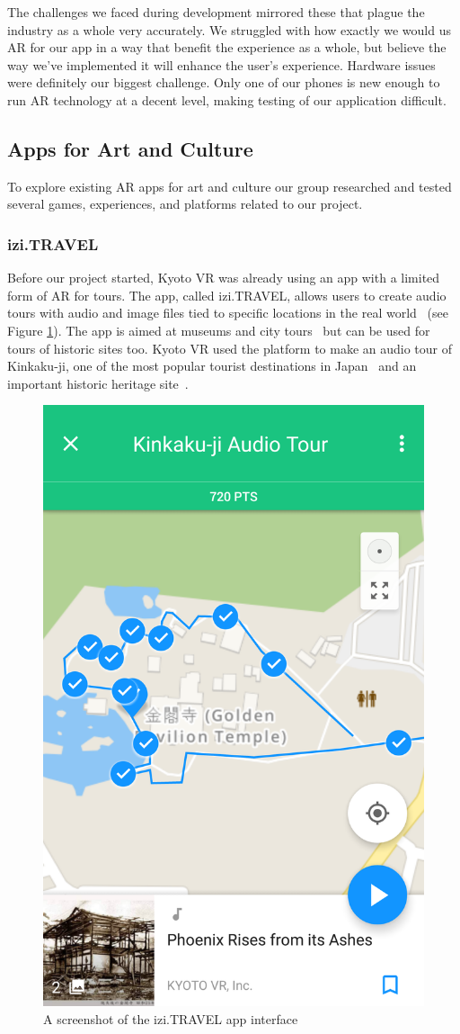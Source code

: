 \documentclass[a4paper, 10pt, american, titlepage]{article}
\begin{document}
The challenges we faced during development mirrored these that plague the
industry as a whole very accurately. We struggled with how exactly we would us
AR for our app in a way that benefit the experience as a whole, but believe the
way we've implemented it will enhance the user's experience. Hardware issues
were definitely our biggest challenge.  Only one of our phones is new enough to
run AR technology at a decent level, making testing of our application
difficult.  

\subsection{Apps for Art and Culture}
\label{sec:appsForArtAndCulture}

To explore existing AR apps for art and culture our group researched and tested
several games, experiences, and platforms related to our project.

\subsubsection{izi.TRAVEL}
\label{sec:iziTravel}

Before our project started, Kyoto VR was already using an app with a limited
form of AR for tours. The app, called izi.TRAVEL, allows users to create audio
tours with audio and image files tied to specific locations in the real
world~\autocite{izitravel2015} (see Figure \ref{fig:iziTravel}). The app is
aimed at museums and city tours~\autocite{izitravel} but can be used for tours
of historic sites too.  Kyoto VR used the platform to make an audio tour of
Kinkaku-ji, one of the most popular tourist destinations in
Japan~\autocite{bornoff2000} and an important historic heritage
site~\autocite{unesco}.


\begin{figure}[h]
	\centering
	\includegraphics[width=.5\textwidth]{izi-travel.png}
	\caption{A screenshot of the izi.TRAVEL app interface}
	\label{fig:iziTravel}
\end{figure}
\end{document}

